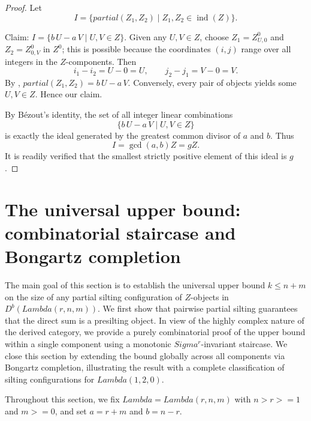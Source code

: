 \documentclass[11pt, a4paper]{article}
\theoremstyle{definition}
\def\Lambda{Lambda}%
\def\Sigma{Sigma}%
\def\partial{partial}%
\def\ge{>=}%
\def\mathbb#1{#1}%
\def\mathcal#1{#1}%
\def\Db{D^b}%
\newcommand{\Db}{\mathcal{D}^b}
\begin{document}
\begin{proof}
Let
\[
  I = \{\partial(Z_1, Z_2) \mid Z_1, Z_2 \in \operatorname{ind}(\mathcal Z)\}.
\]

Claim: $I = \{b\,U - a\,V \mid U, V \in \mathbb Z\}$.
Given any $U, V \in \mathbb Z$, choose $Z_1 = Z_{U, 0}^0$ and $Z_2 = Z_{0, V}^0$ in $\mathcal Z^0$; this is possible because the coordinates $(i,j)$ range over all integers in the $\mathcal Z$-components. Then
\[
  i_1 - i_2 = U - 0 = U, \qquad j_2 - j_1 = V - 0 = V.
\]
By , $\partial(Z_1, Z_2) = b\,U - a\,V$. Conversely, every pair of objects yields some $U, V \in \mathbb Z$. Hence our claim.

By B\'ezout's identity, the set of all integer linear combinations
\[
  \{b\,U - a\,V \mid U, V \in \mathbb Z\}
\]
is exactly the ideal generated by the greatest common divisor of $a$ and $b$. Thus
\[
  I = \gcd(a,b)\mathbb Z = g \mathbb Z.
\]
It is readily verified that the smallest strictly positive element of this ideal is $g$.
\end{proof}



\section{The universal upper bound: combinatorial staircase and Bongartz completion}
\label{sec:bound}

The main goal of this section is to establish the universal upper bound $k \le n+m$ on the size of any partial silting configuration of $\mathcal Z$-objects in $\Db(\Lambda(r,n,m))$. We first show that pairwise partial silting guarantees that the direct sum is a presilting object. In view of the highly complex nature of the derived category, we provide a purely combinatorial proof of the upper bound within a single component using a monotonic $\Sigma^r$-invariant staircase. We close this section by extending the bound globally across all components via Bongartz completion, illustrating the result with a complete classification of silting configurations for $\Lambda(1,2,0)$.

Throughout this section, we fix $\Lambda = \Lambda(r,n,m)$ with $n > r \ge 1$ and $m \ge 0$, and set $a = r+m$ and $b = n-r$.

\end{document}
